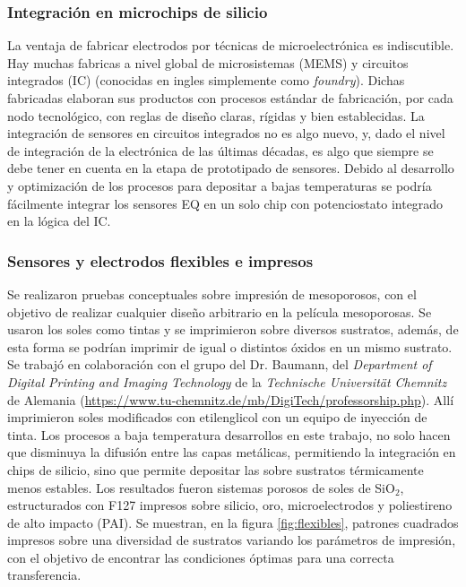 	\subsubsection{Integración en microchips de silicio}

	  La ventaja de fabricar electrodos por técnicas de microelectrónica es indiscutible. Hay muchas fabricas a nivel global de microsistemas (MEMS) y circuitos integrados (IC) (conocidas en ingles simplemente como \textit{foundry}). Dichas fabricadas elaboran sus productos con procesos estándar de fabricación, por cada nodo tecnológico, con reglas de diseño claras, rígidas y bien establecidas. La integración de sensores en circuitos integrados no es algo nuevo, y, dado el nivel de integración de la electrónica de las últimas décadas, es algo que siempre se debe tener en cuenta en la etapa de prototipado de sensores.\cite{Wang2012,Liu1993,Novell2012,Yu2013,Sarkar2014} Debido al desarrollo y optimización de los procesos para depositar \pdm\space a bajas temperaturas se podría fácilmente integrar los sensores EQ en un solo chip con potenciostato integrado en la lógica del IC.
 	
 	\subsubsection{Sensores y electrodos flexibles e impresos}

 	  Se realizaron pruebas conceptuales sobre impresión de mesoporosos, con el objetivo de realizar cualquier diseño arbitrario en la película mesoporosas. Se usaron los soles como tintas y se imprimieron sobre diversos sustratos, además, de esta forma se podrían imprimir \pdm\space de igual o distintos óxidos en un mismo sustrato. Se trabajó en colaboración con el grupo del Dr. Baumann, del \textit{Department of Digital Printing and Imaging Technology} de la \textit{Technische Universität Chemnitz} de Alemania (\url{https://www.tu-chemnitz.de/mb/DigiTech/professorship.php}). Allí imprimieron soles modificados con etilenglicol con un equipo de inyección de tinta. Los procesos a baja temperatura desarrollos en este trabajo, no solo hacen que disminuya la difusión entre las capas metálicas, permitiendo la integración en chips de silicio, sino que permite depositar las \pdm\space sobre sustratos térmicamente menos estables. Los resultados fueron sistemas porosos de soles de SiO$_2$, estructurados con F127 impresos sobre silicio, oro, microelectrodos y poliestireno de alto impacto (PAI). Se muestran, en la figura \ref{fig:flexibles}, patrones cuadrados impresos sobre una diversidad de sustratos variando los parámetros de impresión, con el objetivo de encontrar las condiciones óptimas para una correcta transferencia.

